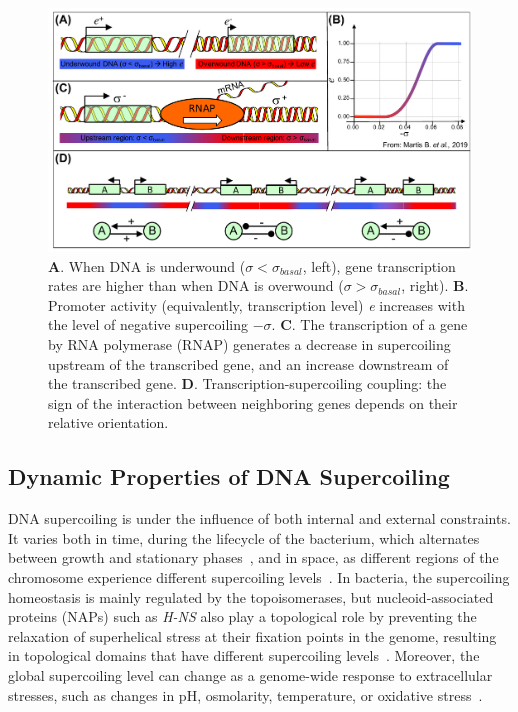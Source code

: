 \begin{figure}[H]
  \centering
  \includegraphics[width=\textwidth]{alife/img/fig-theorique.pdf}
  \caption[Role of supercoiling in transcription, and description of the TSC]{\textbf{A}. When DNA is underwound ($\sigma < \sigma_{basal}$, left), gene transcription rates are higher than when DNA is overwound ($\sigma > \sigma_{basal}$, right).
  \textbf{B}. Promoter activity (equivalently, transcription level) \emph{e} increases with the level of negative supercoiling $-\sigma$.
  \textbf{C}. The transcription of a gene by RNA polymerase (RNAP) generates a decrease in supercoiling upstream of the transcribed gene, and an increase downstream of the transcribed gene.
  \textbf{D}. Transcription-supercoiling coupling: the sign of the interaction between neighboring genes depends on their relative orientation.}
  \label{fig:alife:theory}
\end{figure}


\subsection{Dynamic Properties of DNA Supercoiling}

DNA supercoiling is under the influence of both internal and external constraints.
It varies both in time, during the lifecycle of the bacterium, which alternates between growth and stationary phases~\citep{krogh2018}, and in space, as different regions of the chromosome experience different supercoiling levels~\citep{lal2016, junier2016}.
In bacteria, the supercoiling homeostasis is mainly regulated by the topoisomerases, but nucleoid-associated proteins (NAPs) such as \emph{H-NS} also play a topological role by preventing the relaxation of superhelical stress at their fixation points in the genome, resulting in topological domains that have different supercoiling levels~\citep{krogh2018}.
Moreover, the global supercoiling level can change as a genome-wide response to extracellular stresses, such as changes in pH, osmolarity, temperature, or oxidative stress~\citep{duprey2021}.

